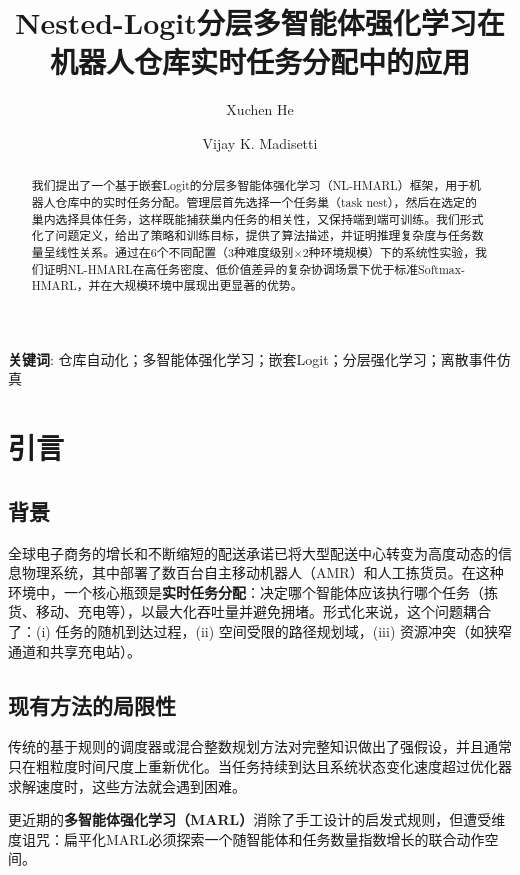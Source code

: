 \documentclass[12pt,a4paper]{article}
\begin{document}
\title{Nested-Logit分层多智能体强化学习在机器人仓库实时任务分配中的应用}
\author{Xuchen He \and Vijay K. Madisetti}
\date{}
\maketitle

\begin{abstract}
我们提出了一个基于嵌套Logit的分层多智能体强化学习（NL-HMARL）框架，用于机器人仓库中的实时任务分配。管理层首先选择一个任务巢（task nest），然后在选定的巢内选择具体任务，这样既能捕获巢内任务的相关性，又保持端到端可训练。我们形式化了问题定义，给出了策略和训练目标，提供了算法描述，并证明推理复杂度与任务数量呈线性关系。通过在6个不同配置（3种难度级别$\times$2种环境规模）下的系统性实验，我们证明NL-HMARL在高任务密度、低价值差异的复杂协调场景下优于标准Softmax-HMARL，并在大规模环境中展现出更显著的优势。
\end{abstract}

\textbf{关键词}: 仓库自动化；多智能体强化学习；嵌套Logit；分层强化学习；离散事件仿真

\section{引言}

\subsection{背景}

全球电子商务的增长和不断缩短的配送承诺已将大型配送中心转变为高度动态的信息物理系统，其中部署了数百台自主移动机器人（AMR）和人工拣货员。在这种环境中，一个核心瓶颈是\textbf{实时任务分配}：决定哪个智能体应该执行哪个任务（拣货、移动、充电等），以最大化吞吐量并避免拥堵。形式化来说，这个问题耦合了：(i) 任务的随机到达过程，(ii) 空间受限的路径规划域，(iii) 资源冲突（如狭窄通道和共享充电站）。

\subsection{现有方法的局限性}

传统的基于规则的调度器或混合整数规划方法对完整知识做出了强假设，并且通常只在粗粒度时间尺度上重新优化。当任务持续到达且系统状态变化速度超过优化器求解速度时，这些方法就会遇到困难。

更近期的\textbf{多智能体强化学习（MARL）}消除了手工设计的启发式规则，但遭受维度诅咒：扁平化MARL必须探索一个随智能体和任务数量指数增长的联合动作空间。
\end{document}
